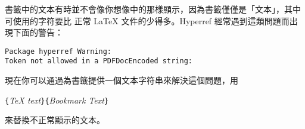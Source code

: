 
書籤中的文本有時並不會像你想像中的那樣顯示，因為書籤僅僅是「文本」，其中可使用的字符要比
正常 \LaTeX{} 文件的少得多。Hyperref 經常遇到這類問題而出現下面的警告：

\begin{code}
\begin{verbatim}
Package hyperref Warning:
Token not allowed in a PDFDocEncoded string:
\end{verbatim}
\end{code}


現在你可以通過為書籤提供一個文本字符串來解決這個問題，用
\begin{lscommand}
\verb|{|\emph{\TeX{} text}\verb|}{|\emph{Bookmark Text}\verb|}|
\end{lscommand}
\noindent 來替換不正常顯示的文本。


